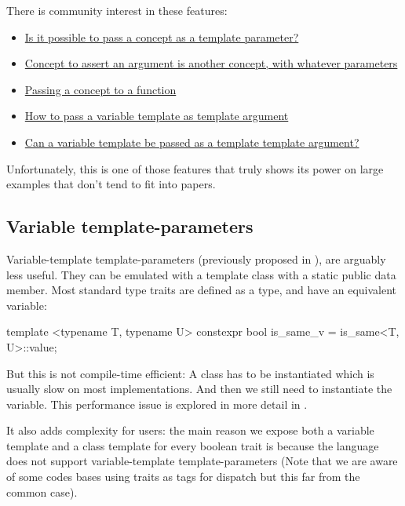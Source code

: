 \documentclass{wg21}
\begin{document}
There is community interest in these features:

\begin{itemize}
\item \href{https://stackoverflow.com/questions/63098070/is-it-possible-to-pass-a-concept-as-a-template-parameter}{Is it possible to pass a concept as a template parameter?}
\item \href{https://stackoverflow.com/questions/72488554/concept-to-assert-an-argument-is-another-concept-with-whatever-parameters}{Concept to assert an argument is another concept, with whatever parameters}
\item \href{https://stackoverflow.com/questions/58875829/passing-a-concept-to-a-function}{Passing a concept to a function}
\item \href{https://stackoverflow.com/questions/61664468/how-to-pass-a-variable-template-as-template-argument}{How to pass a variable template as template argument}
\item \href{https://stackoverflow.com/questions/58592312/can-a-variable-template-be-passed-as-a-template-template-argument}{Can a variable template be passed as a template template argument?}
\end{itemize}

Unfortunately, this is one of those features that truly shows its power on large examples that don't tend to fit into papers.


\subsection{Variable template-parameters}

Variable-template template-parameters (previously proposed in ), are arguably less useful.
They can be emulated with a template class with a static public  data member.
Most standard type traits are defined as a type, and have an equivalent  variable:
\begin{colorblock}
template <typename T, typename U>
constexpr bool is_same_v = is_same<T, U>::value;
\end{colorblock}

But this is not compile-time efficient: A class has to be instantiated which is usually slow on most implementations.
And then we still need to instantiate the variable. This performance issue is explored in more detail in .

It also adds complexity for users: the main reason we expose both a variable template and a class template for every boolean trait is because the language does not support variable-template template-parameters (Note that we are aware of some codes bases using traits as tags for dispatch but this far from the common case).
\end{document}
